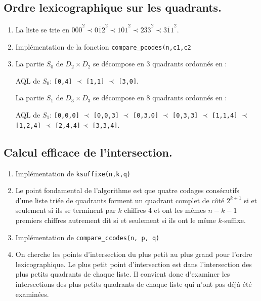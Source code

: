 \subsection{Ordre lexicographique sur les quadrants.}
\begin{enumerate}[resume]
 \item La liste se trie en $\overline{000}^2 \prec  \overline{012}^2 \prec  \overline{101}^2 \prec  \overline{233}^2 \prec  \overline{311}^2$. 

 \item Implémentation de la fonction \texttt{compare\_pcodes(n,c1,c2}


  \item La partie $S_0$ de $D_2 \times D_2$ se décompose en 3 quadrants ordonnés en :
\begin{center}
AQL de $S_0$:  \texttt{[0,4]} $\prec$ \texttt{[1,1]} $\prec$ \texttt{[3,0]}.
\end{center}
La partie $S_1$ de $D_3 \times D_3$ se décompose en 8 quadrants ordonnés en :
\begin{center}
AQL de $S_1$:  \texttt{[0,0,0]} $\prec$ \texttt{[0,0,3]} $\prec$ \texttt{[0,3,0]} $\prec$ \texttt{[0,3,3]} $\prec$ \texttt{[1,1,4]} $\prec$ \texttt{[1,2,4]} $\prec$ \texttt{[2,4,4]}$\prec$ \texttt{[3,3,4]}.
\end{center}   

\end{enumerate}


\subsection{Calcul efficace de l'intersection.}
\begin{enumerate}[resume]
 \item Implémentation de \texttt{ksuffixe(n,k,q)}


 \item Le point fondamental de l'algorithme est que quatre codages consécutifs d'une liste triée de quadrants forment un quadrant complet de côté $2^{k+1}$ si et seulement si ils se terminent par $k$ chiffres 4 et ont les mêmes $n-k-1$ premiers chiffres autrement dit si et seulement si ils ont le même $k$-suffixe.
 
 
 
 \item Implémentation de \texttt{compare\_ccodes(n, p, q)}


 \item On cherche les points d'intersection du plus petit au plus grand pour l'ordre lexicographique. Le plus petit point d'intersection est dans l'intersection des plus petits quadrants de chaque liste. Il convient donc d'examiner les intersections des plus petits quadrants de chaque liste qui n'ont pas déjà été examinées.
 
\end{enumerate}
